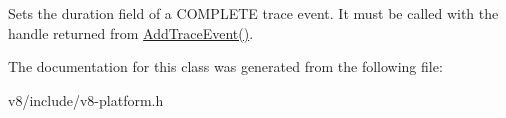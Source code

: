 Sets the duration field of a C\+O\+M\+P\+L\+E\+TE trace event. It must be called with the handle returned from \mbox{\hyperlink{classv8_1_1TracingController_ad1e234b340ea8f9f1e3386aa21dad5dd}{Add\+Trace\+Event()}}. 

The documentation for this class was generated from the following file\+:\begin{DoxyCompactItemize}
\item 
v8/include/v8-\/platform.\+h\end{DoxyCompactItemize}
